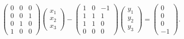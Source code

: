 \documentclass[12pt]{article}
\begin{document}
    \begin{gather}
        \label{4:a:system}
        \begin{pmatrix}
            0 & 0 & 0 \\
            0 & 0 & 1 \\
            0 & 1 & 0 \\
            1 & 0 & 0
        \end{pmatrix}
        \begin{pmatrix}
            x_1 \\ x_2 \\ x_3
        \end{pmatrix}
        -
        \begin{pmatrix}
            1 & 0 & -1 \\
            1 & 1 & 1  \\
            1 & 1 & 0  \\
            0 & 0 & 0
        \end{pmatrix}
        \begin{pmatrix}
            y_1 \\ y_2 \\ y_3
        \end{pmatrix}
        =
        \begin{pmatrix}
            0 \\
            0 \\
            0 \\
            -1
        \end{pmatrix} .
    \end{gather}
\end{document}
